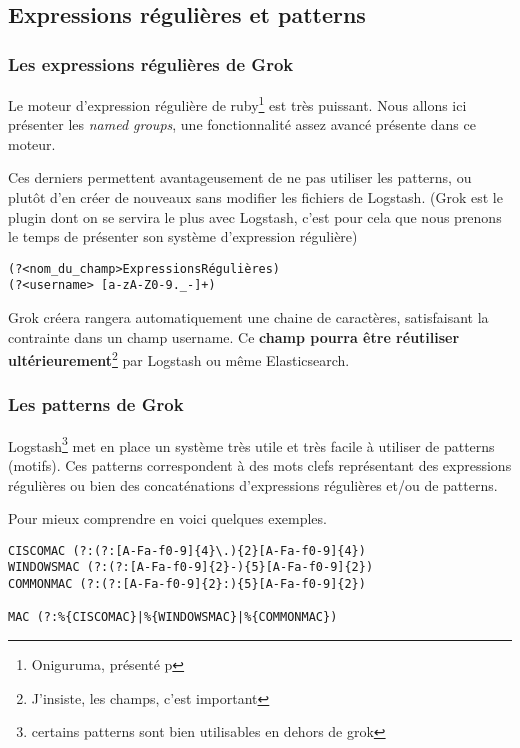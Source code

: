 \subsection{Expressions régulières et patterns}

\subsubsection{Les expressions régulières de Grok}
Le moteur d'expression régulière de ruby\footnote{Oniguruma, présenté p\pageref{subsec:logstashregexengine}} est très puissant. 
Nous allons ici présenter les \emph{named groups}, une fonctionnalité assez avancé présente dans ce moteur.

Ces derniers permettent avantageusement de ne pas utiliser les patterns, ou plutôt d'en créer
de nouveaux sans modifier les fichiers de Logstash.
{\footnotesize(Grok est le plugin dont on se servira le plus avec Logstash, c'est 
pour cela que nous prenons le temps de présenter son système d'expression régulière)}


\begin{lstlisting}[style=logstash,label={lst:grokregex1},caption={Named group}]
(?<nom_du_champ>ExpressionsRégulières) 
(?<username> [a-zA-Z0-9._-]+)
\end{lstlisting}

Grok créera rangera automatiquement une chaine de caractères, satisfaisant la contrainte 
\ipath{/[a-zA-Z0-9.\_-]+/}  dans un champ  username. 
Ce \textbf{champ pourra être réutiliser ultérieurement}\footnote{J'insiste, les 
champs, c'est important} par Logstash ou même Elasticsearch.

\subsubsection{Les patterns de Grok}
Logstash\footnote{certains patterns sont bien utilisables en dehors de grok} met en place un système très utile et très facile à utiliser de patterns 
(motifs). Ces patterns correspondent à des mots clefs représentant des expressions 
régulières ou bien des concaténations d'expressions régulières et/ou de patterns.

Pour mieux comprendre en voici quelques exemples. 

\begin{lstlisting}[style=logstash,label={lst:patternsexplication1},caption={Exemple de définition et d'utilisation de Patterns}]
CISCOMAC (?:(?:[A-Fa-f0-9]{4}\.){2}[A-Fa-f0-9]{4})
WINDOWSMAC (?:(?:[A-Fa-f0-9]{2}-){5}[A-Fa-f0-9]{2})
COMMONMAC (?:(?:[A-Fa-f0-9]{2}:){5}[A-Fa-f0-9]{2})

MAC (?:%{CISCOMAC}|%{WINDOWSMAC}|%{COMMONMAC})
\end{lstlisting}

